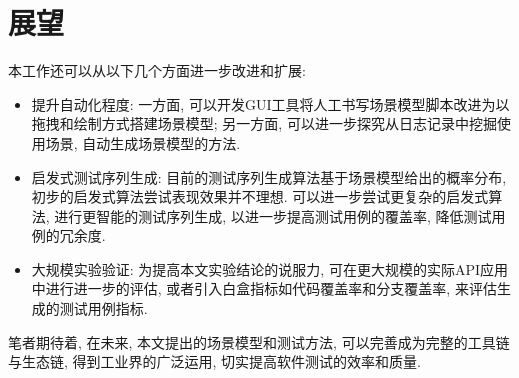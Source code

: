     \section{展望}
    
        本工作还可以从以下几个方面进一步改进和扩展:
        \begin{itemize}
            \item 提升自动化程度: 一方面, 可以开发GUI工具将人工书写场景模型脚本改进为以拖拽和绘制方式搭建场景模型; 另一方面, 可以进一步探究从日志记录中挖掘使用场景, 自动生成场景模型的方法.
            \item 启发式测试序列生成: 目前的测试序列生成算法基于场景模型给出的概率分布, 初步的启发式算法尝试表现效果并不理想. 可以进一步尝试更复杂的启发式算法, 进行更智能的测试序列生成, 以进一步提高测试用例的覆盖率, 降低测试用例的冗余度.
            \item 大规模实验验证: 为提高本文实验结论的说服力, 可在更大规模的实际API应用中进行进一步的评估, 或者引入白盒指标如代码覆盖率和分支覆盖率, 来评估生成的测试用例指标.
        \end{itemize}
        
        笔者期待着, 在未来, 本文提出的场景模型和测试方法, 可以完善成为完整的工具链与生态链, 得到工业界的广泛运用, 切实提高软件测试的效率和质量.
